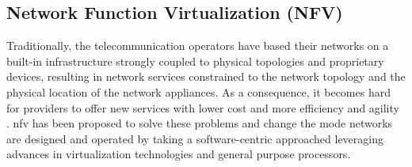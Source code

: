 








\subsection{Network Function Virtualization (NFV)}
\label{subsec:nfv}
Traditionally, the telecommunication operators have based their networks on a built-in infrastructure strongly coupled to physical topologies and proprietary devices, resulting in network services constrained to the network topology and the physical location of the network appliances. As a consequence, it becomes hard for providers to offer new services with lower cost and more efficiency and agility \cite{Mijumbi2016NetworkChallenges}. \acrlong{nfv} has been proposed to solve these problems \cite{ETSI2012NetworkAction} and change the mode networks are designed and operated by taking a software-centric approached leveraging advances in virtualization technologies and general purpose processors.

